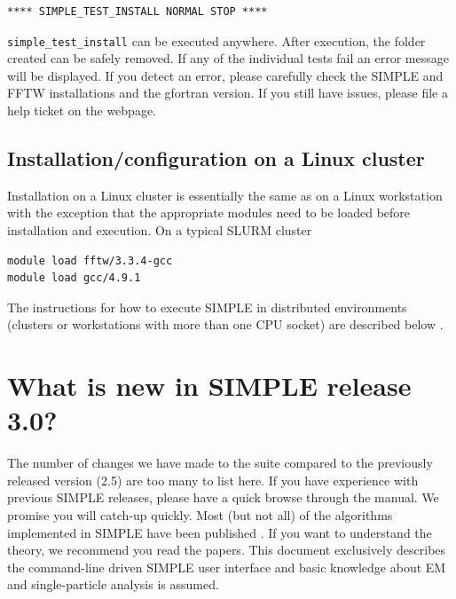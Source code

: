 \documentclass[a4paper,11pt]{article}
\begin{document}
\begin{Verbatim}[commandchars=+\[\],fontsize=\small,breaklines=true]
 **** SIMPLE_TEST_INSTALL NORMAL STOP ****
\end{Verbatim}

\noindent{}\texttt{simple\_test\_install} can be executed anywhere. After execution, the folder created can be safely removed. If any of the individual 
tests fail an error message will be displayed. If you detect an error, please carefully check the SIMPLE and FFTW installations 
and the gfortran version. If you still have issues, please file a help ticket on the webpage.

\subsection{Installation/configuration on a Linux cluster}

Installation on a Linux cluster is essentially the same as on a Linux workstation with the exception that the appropriate modules need to be loaded before installation and execution. On a typical SLURM cluster
\begin{Verbatim}[commandchars=+\[\],fontsize=\small,breaklines=true]
module load fftw/3.3.4-gcc
module load gcc/4.9.1
\end{Verbatim}
The instructions for how to execute SIMPLE in distributed environments (clusters or workstations with more than one CPU socket) are described below \label{distr}.

\section{What is new in SIMPLE release 3.0?}
The number of changes we have made to the suite compared to the previously released version (2.5) are too many to list here. If you have experience with previous SIMPLE releases, please have a quick browse through the manual. We promise you will catch-up quickly. Most (but not all) of the algorithms implemented in SIMPLE have been published \citep{reboul2016stochastic,Elmlund:2013aa,Elmlund:2012aa,Reboul:2018aa}. If you want to understand the theory, we recommend you read the papers. This document exclusively describes the command-line driven SIMPLE user interface and basic knowledge about EM and single-particle analysis is assumed. 
\end{document}

